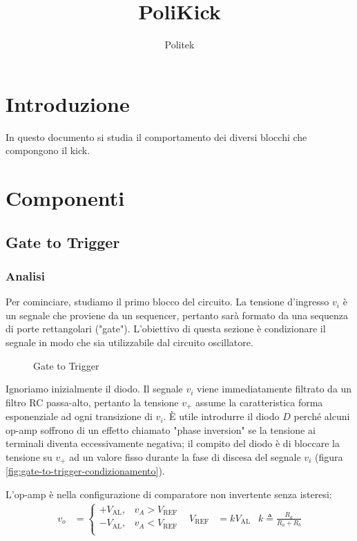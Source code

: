 \documentclass{article}
\title{PoliKick}
\author{Politek}
\newcommand{\var}[2]{#1_\text{#2}}
\theoremstyle{definition}
\begin{document}
\maketitle



\section{Introduzione}
In questo documento si studia il comportamento dei diversi blocchi che compongono il kick.

\section{Componenti}

\subsection{Gate to Trigger}

\subsubsection{Analisi}
Per cominciare, studiamo il primo blocco del circuito.
La tensione d'ingresso \(v_i\) è un segnale che proviene da un sequencer, pertanto sarà formato da una sequenza di porte rettangolari ("gate").
L'obiettivo di questa sezione è condizionare il segnale in modo che sia utilizzabile dal circuito oscillatore.

\begin{figure}[ht]
    \centering
    
    \label{fig:gate-to-trigger}
    \caption{Gate to Trigger}
\end{figure}

Ignoriamo inizialmente il diodo. Il segnale \(v_i\) viene immediatamente filtrato da un filtro RC passa-alto, pertanto la tensione \(v_+\) assume la caratteristica forma esponenziale ad ogni transizione di \(v_i\).
È utile introdurre il diodo \(D\) perché alcuni op-amp soffrono di un effetto chiamato "phase inversion" se la tensione ai terminali diventa eccessivamente negativa; il compito del diodo è di bloccare la tensione su \(v_+\) ad un valore fisso durante la fase di discesa del segnale \(v_i\) (figura \ref{fig:gate-to-trigger-condizionamento}).

L'op-amp è nella configurazione di comparatore non invertente senza isteresi:
\begin{align*}
    v_o &= \begin{cases}
        +\var{V}{AL}, & v_A > \var{V}{REF} \\
        -\var{V}{AL}, & v_A < \var{V}{REF} \\
    \end{cases}
    &
    \var{V}{REF} &= k \var{V}{AL}
    &
    k \triangleq \frac{R_a}{R_a + R_b}
\end{align*}
\end{document}
